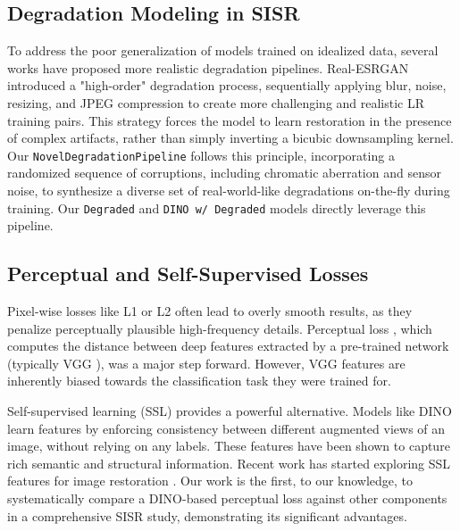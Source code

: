 \documentclass[10pt,twocolumn,letterpaper]{article}
\begin{document}
\subsection{Degradation Modeling in SISR}
To address the poor generalization of models trained on idealized data, several works have proposed more realistic degradation pipelines. Real-ESRGAN \cite{wang2021real} introduced a "high-order" degradation process, sequentially applying blur, noise, resizing, and JPEG compression to create more challenging and realistic LR training pairs. This strategy forces the model to learn restoration in the presence of complex artifacts, rather than simply inverting a bicubic downsampling kernel. Our \texttt{NovelDegradationPipeline} follows this principle, incorporating a randomized sequence of corruptions, including chromatic aberration and sensor noise, to synthesize a diverse set of real-world-like degradations on-the-fly during training. Our \texttt{Degraded} and \texttt{DINO w/ Degraded} models directly leverage this pipeline.

\subsection{Perceptual and Self-Supervised Losses}
Pixel-wise losses like L1 or L2 often lead to overly smooth results, as they penalize perceptually plausible high-frequency details. Perceptual loss \cite{johnson2016perceptual}, which computes the distance between deep features extracted by a pre-trained network (typically VGG \cite{simonyan2014very}), was a major step forward. However, VGG features are inherently biased towards the classification task they were trained for.

Self-supervised learning (SSL) provides a powerful alternative. Models like DINO \cite{caron2021emerging} learn features by enforcing consistency between different augmented views of an image, without relying on any labels. These features have been shown to capture rich semantic and structural information. Recent work has started exploring SSL features for image restoration \cite{wang2023dall}. Our work is the first, to our knowledge, to systematically compare a DINO-based perceptual loss against other components in a comprehensive SISR study, demonstrating its significant advantages.
\end{document}
